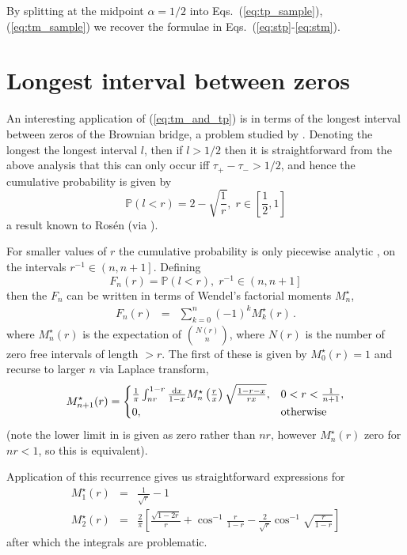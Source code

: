 \documentclass{article}
\newcommand{\tm}{{\tau_{\mathrm{-}}}}
\newcommand{\tp}{{\tau_{\mathrm{+}}}}
\begin{document}
By splitting at the midpoint $\alpha=1/2$ into Eqs.~(\ref{eq:tp_sample}),(\ref{eq:tm_sample}) we recover the formulae in Eqs.~(\ref{eq:stp}-\ref{eq:stm}).

\section{Longest interval between zeros}

An interesting application of (\ref{eq:tm_and_tp}) is in terms of the longest interval between zeros of the Brownian bridge, a problem studied by \cite{wendel,godreche}. Denoting the longest the longest interval $l$, then if $l > 1/2$ then it is straightforward from the above analysis that this can only occur iff $\tp-\tm > 1/2$, and hence the cumulative probability is given by
\begin{equation}
  \mathbb{P}(l < r) = 2 - \sqrt{\frac{1}{r}}, \; r\in \left[ \frac{1}{2},1 \right]
\end{equation}
a result known to Ros\'en (via \cite{wendel}). 

For smaller values of $r$ the cumulative probability is only piecewise analytic \cite{godreche}, on the intervals $r^{-1} \in \left(n, n+1\right]$. Defining
\begin{equation}
  F_n(r) = \mathbb{P}(l < r), \; r^{-1} \in \left(n, n+1\right]
\end{equation}
then the $F_n$ can be written in terms of Wendel's factorial moments $M^\star_n$,
\begin{eqnarray}
  F_n(r) &=& \sum_{k=0}^n (-1)^k M^\star_k(r) \, . \label{eq:q_from_moment}
\end{eqnarray}
where $M^\star_n(r)$ is the expectation of $N(r) \choose n$, where $N(r)$ is the number of zero free intervals of length $> r$. The first of these is given by $M^\star_0(r) = 1$ and recurse to larger $n$ via Laplace transform,
\begin{equation}
  M^\star_{n+1}(r) = \begin{cases}
    \frac{1}{\pi} \int_{nr}^{1-r} \frac{{\rm d}x}{1-x} M^\star_n\left(\frac{r}{x}\right) \sqrt{\frac{1-r-x}{rx}}, & 0<r<\frac{1}{n+1}, \\
    0, & \text{otherwise}
    \end{cases}
\end{equation}
(note the lower limit in \cite{wendel} is given as zero rather than $nr$, however $M^\star_n(r)$ zero for $nr < 1$, so this is equivalent).

Application of this recurrence gives us straightforward expressions for 
\begin{eqnarray}
  M^\star_1(r) &=& \frac{1}{\sqrt{r}} - 1 \\
  M^\star_2(r) &=& \frac{2}{\pi}\left[\frac{\sqrt{1-2r}}{r} + \cos^{-1}\frac{r}{1-r}-\frac{2}{\sqrt{r}} \cos^{-1} \sqrt{\frac{r}{1-r}}\right]
\end{eqnarray}
after which the integrals are problematic.
\end{document}
